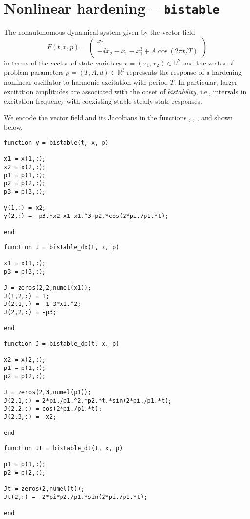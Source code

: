 \section{Nonlinear hardening -- \texttt{bistable}}
The nonautonomous dynamical system given by the vector field
\begin{equation}
F(t,x,p)=\left(\begin{array}{c}x_2\\-dx_2-x_1-x_1^3+A\cos\left(2\pi t/T\right)\end{array}\right)
\end{equation}
in terms of the vector of state variables $x=(x_1,x_2)\in\mathbb{R}^2$ and the vector of problem parameters $p=(T,A,d)\in\mathbb{R}^3$ represents the response of a hardening nonlinear oscillator to harmonic excitation with period $T$. In particular, larger excitation amplitudes are associated with the onset of \emph{bistability}, i.e., intervals in excitation frequency with coexisting stable steady-state responses.

We encode the vector field and its Jacobians in the functions , , , and  shown below.
\begin{lstlisting}[language=coco-highlight]
function y = bistable(t, x, p)

x1 = x(1,:);
x2 = x(2,:);
p1 = p(1,:);
p2 = p(2,:);
p3 = p(3,:);

y(1,:) = x2;
y(2,:) = -p3.*x2-x1-x1.^3+p2.*cos(2*pi./p1.*t);

end
\end{lstlisting}
\begin{lstlisting}[language=coco-highlight]
function J = bistable_dx(t, x, p)

x1 = x(1,:);
p3 = p(3,:);

J = zeros(2,2,numel(x1));
J(1,2,:) = 1;
J(2,1,:) = -1-3*x1.^2;
J(2,2,:) = -p3;

end
\end{lstlisting}
\begin{lstlisting}[language=coco-highlight]
function J = bistable_dp(t, x, p)

x2 = x(2,:);
p1 = p(1,:);
p2 = p(2,:);

J = zeros(2,3,numel(p1));
J(2,1,:) = 2*pi./p1.^2.*p2.*t.*sin(2*pi./p1.*t);
J(2,2,:) = cos(2*pi./p1.*t);
J(2,3,:) = -x2;

end
\end{lstlisting}
\begin{lstlisting}[language=coco-highlight]
function Jt = bistable_dt(t, x, p)

p1 = p(1,:);
p2 = p(2,:);

Jt = zeros(2,numel(t));
Jt(2,:) = -2*pi*p2./p1.*sin(2*pi./p1.*t);

end
\end{lstlisting}

